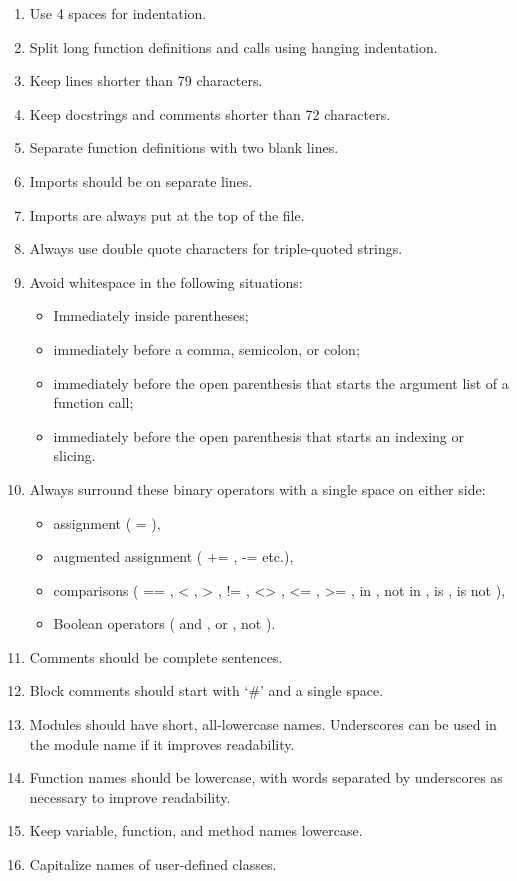 
\begin{enumerate}
\tightlist
\item
  Use 4 spaces for indentation.
\item
  Split long function definitions and calls using hanging indentation.
\item
  Keep lines shorter than 79 characters.
\item
  Keep docstrings and comments shorter than 72 characters.
\item
  Separate function definitions with two blank lines.
\item
  Imports should be on separate lines.
\item
  Imports are always put at the top of the file.
\item
  Always use double quote characters for triple-quoted strings.
\item
  Avoid whitespace in the following situations:

  \begin{itemize}
  \tightlist
  \item
    Immediately inside parentheses;
  \item
    immediately before a comma, semicolon, or colon;
  \item
    immediately before the open parenthesis that starts the argument
    list of a function call;
  \item
    immediately before the open parenthesis that starts an indexing or
    slicing.
  \end{itemize}
\item
  Always surround these binary operators with a single space on either
  side:

  \begin{itemize}
  \tightlist
  \item
    assignment ( = ),
  \item
    augmented assignment ( += , -= etc.),
  \item
    comparisons ( == , \textless{} , \textgreater{} , != ,
    \textless{}\textgreater{} , \textless{}= , \textgreater{}= , in ,
    not in , is , is not ),
  \item
    Boolean operators ( and , or , not ).
  \end{itemize}
\item
  Comments should be complete sentences.
\item
  Block comments should start with `\#' and a single space.
\item
  Modules should have short, all-lowercase names. Underscores can be
  used in the module name if it improves readability.
\item
  Function names should be lowercase, with words separated by
  underscores as necessary to improve readability.
\item
  Keep variable, function, and method names lowercase.
\item
  Capitalize names of user-defined classes.
\end{enumerate}
